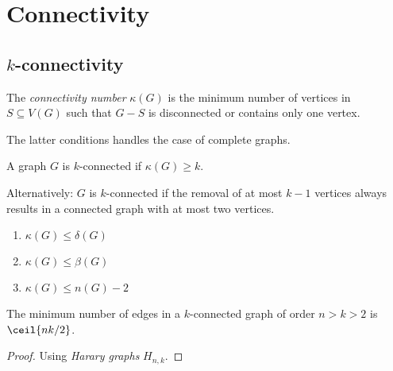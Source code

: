 \section{Connectivity}
\subsection[k-connectivity]{$k$-connectivity}

\begin{definition}
    The \emph{connectivity number} 
    $\kappa(G)$ is the minimum number of vertices in $S \subseteq 
    V(G)$ such that $G - S$ is disconnected or contains only 
    one vertex.
\end{definition}

\begin{remark}
    The latter conditions handles the case of complete graphs.
\end{remark}

\begin{definition}
    A graph $G$ is $k$-connected if $\kappa(G) \ge k$.
\end{definition}

Alternatively: $G$ is $k$-connected if the removal of at most $k-1$ vertices always
results in a connected graph with at most two vertices.

\begin{proposition}
    \begin{enumerate}
        \item $\kappa(G) \le \delta(G)$
        \item $\kappa(G) \le \beta(G)$
        \item $\kappa(G) \le n(G) - 2$
    \end{enumerate}
\end{proposition}


\begin{theorem}
    The minimum number of edges in a $k$-connected graph of 
    order $n > k > 2$ is $\ceil{nk/2}$.
\end{theorem}

\begin{proof}
    Using \emph{Harary graphs} $H_{n,k}$.
\end{proof}


